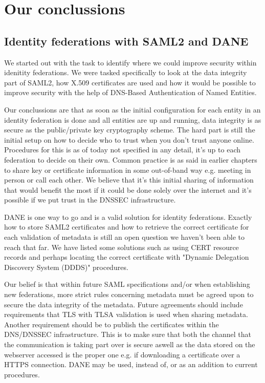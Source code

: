 \section{Our conclussions}
\subsection{Identity federations with SAML2 and DANE}
We started out with the task to identify where we could improve security within idenitity federations.
We were tasked specifically to look at the data integrity part of SAML2, how X.509 certificates are used and how it would be possible to improve security with the help of DNS-Based Authentication of Named Entities.

Our conclussions are that as soon as the initial configuration for each entity in an identity federation is done and all entities are up and running, data integrity is as secure as the public/private key cryptography scheme.
The hard part is still the initial setup on how to decide who to trust when you don't trust anyone online.
Procedures for this is as of today not specified in any detail, it's up to each federation to decide on their own.
Common practice is as said in earlier chapters to share key or certificate information in some out-of-band way e.g. meeting in person or call each other.
We believe that it's this initial sharing of information that would benefit the most if it could be done solely over the internet and it's possible if we put trust in the DNSSEC infrastructure.

DANE is one way to go and is a valid solution for identity federations.
Exactly how to store SAML2 certificates and how to retrieve the correct certificate for each validation of metadata is still an open question we haven't been able to reach that far.
We have listed some solutions such as using CERT resource records and perhaps locating the correct certificate with "Dynamic Delegation Discovery System (DDDS)" procedures.

Our belief is that within future SAML specifications and/or when establishing new federations, more strict rules concerning metadata must be agreed upon to secure the data integrity of the metadata.
Future agreements should include requirements that TLS with TLSA validation is used when sharing metadata.
Another requirement should be to publish the certificates within the DNS/DNSSEC infrastructure.
This is to make sure that both the channel that the communication is taking part over is secure aswell as the data stored on the webserver accessed is the proper one e.g. if downloading a certificate over a HTTPS connection.
DANE may be used, instead of, or as an addition to current procedures.


